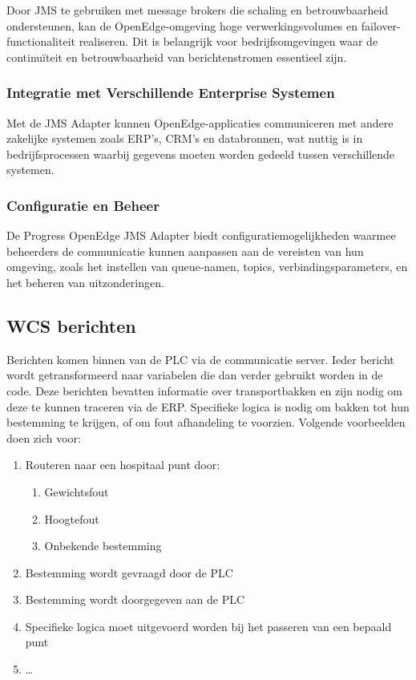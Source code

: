 Door JMS te gebruiken met message brokers die schaling en betrouwbaarheid ondersteunen, kan de OpenEdge-omgeving hoge verwerkingsvolumes en failover-functionaliteit realiseren. Dit is belangrijk voor bedrijfsomgevingen waar de continuïteit en betrouwbaarheid van berichtenstromen essentieel zijn.

\subsubsection{Integratie met Verschillende Enterprise Systemen}
Met de JMS Adapter kunnen OpenEdge-applicaties communiceren met andere zakelijke systemen zoals ERP's, CRM’s en databronnen, wat nuttig is in bedrijfsprocessen waarbij gegevens moeten worden gedeeld tussen verschillende systemen.

\subsubsection{Configuratie en Beheer}
De Progress OpenEdge JMS Adapter biedt configuratiemogelijkheden waarmee beheerders de communicatie kunnen aanpassen aan de vereisten van hun omgeving, zoals het instellen van queue-namen, topics, verbindingsparameters, en het beheren van uitzonderingen.




\subsection{WCS berichten} 
Berichten komen binnen van de PLC via de communicatie server. Ieder bericht wordt getransformeerd naar variabelen die dan verder gebruikt worden in de code.
Deze berichten bevatten informatie over transportbakken en zijn nodig om deze te kunnen traceren via de ERP.
Specifieke logica is nodig om bakken tot hun bestemming te krijgen, of om fout afhandeling te voorzien.
Volgende voorbeelden doen zich voor:
\begin{enumerate}
  \item Routeren naar een hospitaal punt door: 
  \begin{enumerate}
    \item Gewichtsfout
    \item Hoogtefout
    \item Onbekende bestemming
  \end{enumerate}
  \item Bestemming wordt gevraagd door de PLC
  \item Bestemming wordt doorgegeven aan de PLC 
  \item Specifieke logica moet uitgevoerd worden bij het passeren van een bepaald punt
  \item \dots
\end{enumerate}

